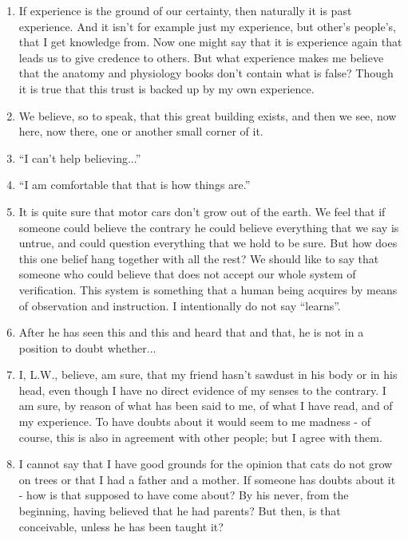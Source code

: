 \documentclass{book}
\begin{document}
\begin{enumerate}
\item
If experience is the ground of our certainty, then naturally it is past
experience.  And it isn't for example just my experience, but other's people's,
that I get knowledge from.  Now one might say that it is experience again that
leads us to give credence to others. But what experience makes me believe that
the anatomy and physiology books don't contain what is false? Though it is true
that this trust is backed up by my own experience.

\item
We believe, so to speak, that this great building exists, and then we see, now
here, now there, one or another small corner of it.

\item
``I can't help believing...''

\item
``I am comfortable that that is how things are.''

\item
It is quite sure that motor cars don't grow out of the earth. We feel that if
someone could believe the contrary he could believe everything that we say is
untrue, and could question everything that we hold to be sure.  But how does
this one belief hang together with all the rest? We should like to say that
someone who could believe that does not accept our whole system of
verification.  This system is something that a human being acquires by means of
observation and instruction. I intentionally do not say ``learns''.

\item
After he has seen this and this and heard that and that, he is not in a
position to doubt whether...

\item
I, L.W., believe, am sure, that my friend hasn't sawdust in his body or in his
head, even though I have no direct evidence of my senses to the contrary. I am
sure, by reason of what has been said to me, of what I have read, and of my
experience. To have doubts about it would seem to me madness - of course, this
is also in agreement with other people; but I agree with them.

\item
I cannot say that I have good grounds for the opinion that cats do not grow on
trees or that I had a father and a mother.  If someone has doubts about it -
how is that supposed to have come about? By his never, from the beginning,
having believed that he had parents? But then, is that conceivable, unless he
has been taught it?


\end{enumerate}
\end{document}
